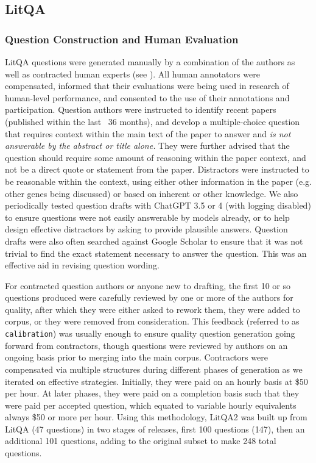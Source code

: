 \documentclass{article}
\begin{document}
\subsection{LitQA}

\subsubsection{Question Construction and Human Evaluation} \label{sec:question_evaluators}

LitQA questions were generated manually by a combination of the authors as well as contracted human experts (see \cite{laurent2024lab}). All human annotators were compensated, informed that their evaluations were being used in research of human-level performance, and consented to the use of their annotations and participation. Question authors were instructed to identify recent papers (published within the last ~36 months), and develop a multiple-choice question that requires context within the main text of the paper to answer and \textit{is not answerable by the abstract or title alone.} They were further advised that the question should require some amount of reasoning within the paper context, and not be a direct quote or statement from the paper. Distractors were instructed to be reasonable within the context, using either other information in the paper (e.g. other genes being discussed) or based on inherent or other knowledge. We also periodically tested question drafts with ChatGPT 3.5 or 4 (with logging disabled) to ensure questions were not easily answerable by models already, or to help design effective distractors by asking to provide plausible answers. Question drafts were also often searched against Google Scholar to ensure that it was not trivial to find the exact statement necessary to answer the question. This was an effective aid in revising question wording.

For contracted question authors or anyone new to drafting, the first 10 or so questions produced were carefully reviewed by one or more of the authors for quality, after which they were either asked to rework them, they were added to corpus, or they were removed from consideration. This feedback (referred to as \verb|calibration|) was usually enough to ensure quality question generation going forward from contractors, though questions were reviewed by authors on an ongoing basis prior to merging into the main corpus. Contractors were compensated via multiple structures during different phases of generation as we iterated on effective strategies. Initially, they were paid on an hourly basis at \$50 per hour. At later phases, they were paid on a completion basis such that they were paid per accepted question, which equated to variable hourly equivalents always \$50 or more per hour. Using this methodology, LitQA2 was built up from LitQA (47 questions) in two stages of releases, first 100 questions (147), then an additional 101 questions, adding to the original subset to make 248 total questions. 
\end{document}
